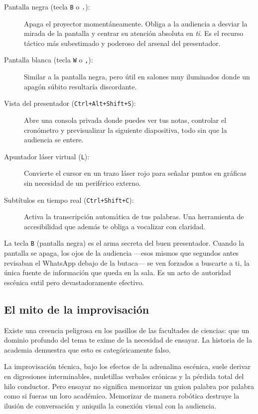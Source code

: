 \begin{description}
	\item[Pantalla negra (tecla \texttt{B} o \texttt{.}):] Apaga el proyector momentáneamente.
	      Obliga a la audiencia a desviar la mirada de la pantalla y centrar su atención absoluta en \emph{ti}.
	      Es el recurso táctico más subestimado y poderoso del arsenal del presentador.
	\item[Pantalla blanca (tecla \texttt{W} o \texttt{,}):] Similar a la pantalla negra, pero útil en salones muy iluminados donde un apagón súbito resultaría discordante.
	\item[Vista del presentador (\texttt{Ctrl+Alt+Shift+S}):] Abre una consola privada donde puedes ver tus notas, controlar el cronómetro y previsualizar la siguiente diapositiva, todo sin que la audiencia se entere.
	\item[Apuntador láser virtual (\texttt{L}):] Convierte el cursor en un trazo láser rojo para señalar puntos en gráficas sin necesidad de un periférico externo.
	\item[Subtítulos en tiempo real (\texttt{Ctrl+Shift+C}):] Activa la transcripción automática de tus palabras.
	      Una herramienta de accesibilidad que además te obliga a vocalizar con claridad.
\end{description}

\begin{remember}
	\label{rem:atajos}
	La tecla \texttt{B} (pantalla negra) es el arma secreta del buen presentador.
	Cuando la pantalla se apaga, los ojos de la audiencia —esos mismos que segundos antes revisaban el WhatsApp debajo de la butaca— se ven forzados a buscarte a ti, la única fuente de información que queda en la sala.
	Es un acto de autoridad escénica sutil pero devastadoramente efectivo.
\end{remember}

\subsection*{El mito de la improvisación}

Existe una creencia peligrosa en los pasillos de las facultades de ciencias: que un dominio profundo del tema te exime de la necesidad de ensayar.
La historia de la academia demuestra que esto es categóricamente falso.

La improvisación técnica, bajo los efectos de la adrenalina escénica, suele derivar en digresiones interminables, muletillas verbales crónicas y la pérdida total del hilo conductor.
Pero ensayar no significa memorizar un guion palabra por palabra como si fueras un loro académico.
Memorizar de manera robótica destruye la ilusión de conversación y aniquila la conexión visual con la audiencia.

